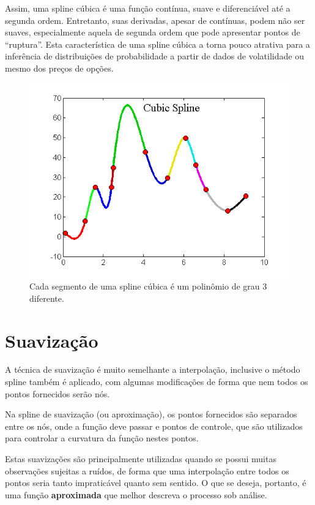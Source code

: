 \documentclass[]{book}
\theoremstyle{definition}
\theoremstyle{definition}
\theoremstyle{definition}
\theoremstyle{remark}
\begin{document}
Assim, uma spline cúbica é uma função contínua, suave e diferenciável
até a segunda ordem. Entretanto, suas derivadas, apesar de contínuas,
podem não ser suaves, especialmente aquela de segunda ordem que pode
apresentar pontos de ``ruptura''. Esta característica de uma spline
cúbica a torna pouco atrativa para a inferência de distribuições de
probabilidade a partir de dados de volatilidade ou mesmo dos preços de
opções.

\begin{figure}
\centering
\includegraphics{./images/cubic_spline.png}
\caption{\label{fig:cubic-spline}Cada segmento de uma spline cúbica é um
polinômio de grau 3 diferente.}
\end{figure}

\section{Suavização}\label{suavizacao}

A técnica de suavização é muito semelhante a interpolação, inclusive o
método spline também é aplicado, com algumas modificações de forma que
nem todos os pontos fornecidos serão nós.

Na spline de suavização (ou aproximação), os pontos fornecidos são
separados entre os nós, onde a função deve passar e pontos de controle,
que são utilizados para controlar a curvatura da função nestes pontos.

Estas suavizações são principalmente utilizadas quando se possui muitas
observações sujeitas a ruídos, de forma que uma interpolação entre todos
os pontos seria tanto impraticável quanto sem sentido. O que se deseja,
portanto, é uma função \textbf{aproximada} que melhor descreva o
processo sob análise.
\end{document}
